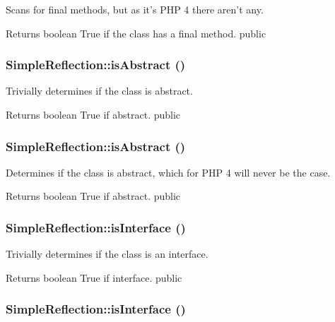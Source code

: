 \label{class_simple_reflection_a643ff5d07c0c1e6d24a6c7fad36da9af}
Scans for final methods, but as it's PHP 4 there aren't any. \begin{DoxyReturn}{Returns}
boolean True if the class has a final method.  public 
\end{DoxyReturn}
\hypertarget{class_simple_reflection_aed337e5d22f6ec345fc1b74e09852156}{
\subsubsection[{isAbstract}]{\setlength{\rightskip}{0pt plus 5cm}SimpleReflection::isAbstract ()}}
\label{class_simple_reflection_aed337e5d22f6ec345fc1b74e09852156}
Trivially determines if the class is abstract. \begin{DoxyReturn}{Returns}
boolean True if abstract.  public 
\end{DoxyReturn}
\hypertarget{class_simple_reflection_aed337e5d22f6ec345fc1b74e09852156}{
\subsubsection[{isAbstract}]{\setlength{\rightskip}{0pt plus 5cm}SimpleReflection::isAbstract ()}}
\label{class_simple_reflection_aed337e5d22f6ec345fc1b74e09852156}
Determines if the class is abstract, which for PHP 4 will never be the case. \begin{DoxyReturn}{Returns}
boolean True if abstract.  public 
\end{DoxyReturn}
\hypertarget{class_simple_reflection_ae5838a6f80eb13ce9ffc1f935ff0768d}{
\subsubsection[{isInterface}]{\setlength{\rightskip}{0pt plus 5cm}SimpleReflection::isInterface ()}}
\label{class_simple_reflection_ae5838a6f80eb13ce9ffc1f935ff0768d}
Trivially determines if the class is an interface. \begin{DoxyReturn}{Returns}
boolean True if interface.  public 
\end{DoxyReturn}
\hypertarget{class_simple_reflection_ae5838a6f80eb13ce9ffc1f935ff0768d}{
\subsubsection[{isInterface}]{\setlength{\rightskip}{0pt plus 5cm}SimpleReflection::isInterface ()}}
